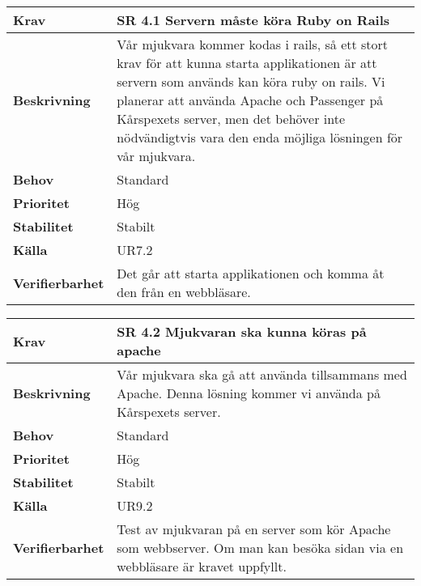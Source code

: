 \documentclass[a4paper, twoside, 11pt, titlepage]{article}
\begin{document}
\begin{tabular} { p{2.6cm} p{12.5cm} }
	\hline
	\sffamily\textbf{Krav} & \sffamily\textbf{SR 4.1 Servern måste köra Ruby on Rails } \\
	\hline
	\sffamily\textbf{Beskrivning} & Vår mjukvara kommer kodas i rails, så ett stort krav för att kunna starta applikationen är att servern som används kan köra ruby on rails. Vi planerar att använda Apache och Passenger på Kårspexets server, men det behöver inte nödvändigtvis vara den enda möjliga lösningen för vår mjukvara.  \\
	\hline
	\sffamily\textbf{Behov} & Standard  \\
	\hline
	\sffamily\textbf{Prioritet} & Hög  \\
	\hline
	\sffamily\textbf{Stabilitet} & Stabilt  \\
	\hline
	\sffamily\textbf{Källa} & UR7.2  \\
	\hline
	\sffamily\textbf{Verifierbarhet} & Det går att starta applikationen och komma åt den från en webbläsare.  \\
	\hline
\end{tabular}
\vspace{6mm}

\begin{tabular} { p{2.6cm} p{12.5cm} }
	\hline
	\sffamily\textbf{Krav} & \sffamily\textbf{SR 4.2 Mjukvaran ska kunna köras på apache } \\
	\hline
	\sffamily\textbf{Beskrivning} & Vår mjukvara ska gå att använda tillsammans med Apache. Denna lösning kommer vi använda på Kårspexets server.  \\
	\hline
	\sffamily\textbf{Behov} & Standard  \\
	\hline
	\sffamily\textbf{Prioritet} & Hög  \\
	\hline
	\sffamily\textbf{Stabilitet} & Stabilt  \\
	\hline
	\sffamily\textbf{Källa} & UR9.2  \\
	\hline
	\sffamily\textbf{Verifierbarhet} & Test av mjukvaran på en server som kör Apache som webbserver. Om man kan besöka sidan via en webbläsare är kravet uppfyllt.  \\
	\hline
\end{tabular}
\vspace{6mm}
\end{document}
